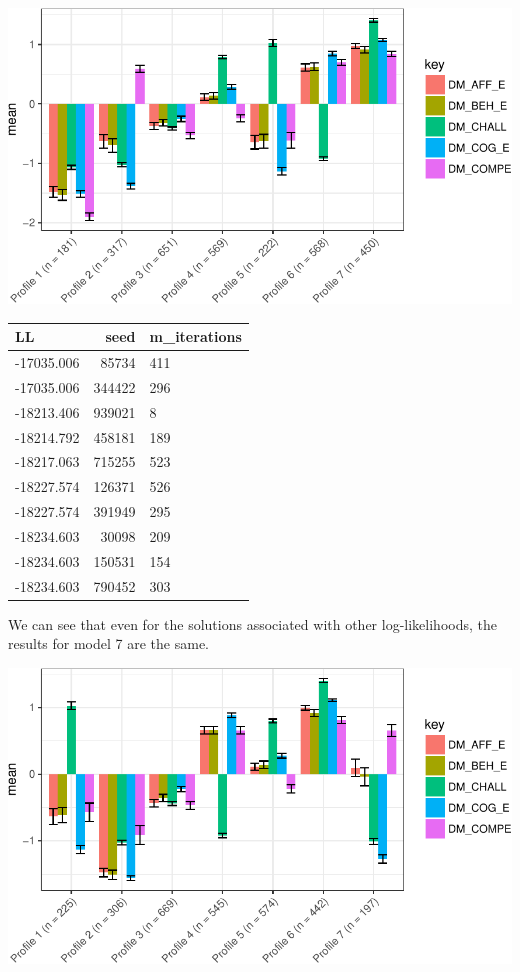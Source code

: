 \documentclass[]{msu-thesis}
\theoremstyle{definition}
\theoremstyle{definition}
\theoremstyle{definition}
\theoremstyle{remark}
\begin{document}
\begin{center}\includegraphics[width=0.8\linewidth]{rosenberg-dissertation_files/figure-latex/m1_7p-1} \end{center}

\begin{tabular}{l|r|l}
\hline
LL & seed & m\_iterations\\
\hline
-17035.006 & 85734 & 411\\
\hline
-17035.006 & 344422 & 296\\
\hline
-18213.406 & 939021 & 8\\
\hline
-18214.792 & 458181 & 189\\
\hline
-18217.063 & 715255 & 523\\
\hline
-18227.574 & 126371 & 526\\
\hline
-18227.574 & 391949 & 295\\
\hline
-18234.603 & 30098 & 209\\
\hline
-18234.603 & 150531 & 154\\
\hline
-18234.603 & 790452 & 303\\
\hline
\end{tabular}

We can see that even for the solutions associated with other
log-likelihoods, the results for model 7 are the same.

\begin{center}\includegraphics[width=0.8\linewidth]{rosenberg-dissertation_files/figure-latex/m1_7-other-LL-p-1} \end{center}
\end{document}
